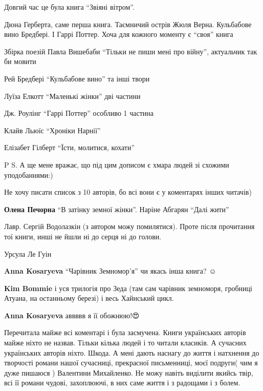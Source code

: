 Довгий час це була книга \enquote{Звіяні вітром}.


Дюна Герберта, саме перша книга. Таємничий острів Жюля Верна. Кульбабове вино
Бредбері. І Гаррі Поттер. Хоча для кожного моменту є \enquote{своя} книга


Збірка поезій Павла Вишебаби \enquote{Тільки не пиши мені про війну}, актуальчик так би мовити


Рей Бредбері \enquote{Кульбабове вино} та інші твори

Луїза Елкотт \enquote{Маленькі жінки} дві частини

Дж. Роулінг \enquote{Гаррі Поттер} особливо 1 частина

Клайв Льюїс \enquote{Хроніки Нарнії}

Елізабет Гілберт \enquote{Їсти, молитися, кохати}

P S. А ще мене вражає, що під цим дописом є хмара людей зі схожими уподобаннями:)

Не хочу писати список з 10 авторів, бо всі вони є у коментарях інших читачів)

\textbf{Олена Печорна} \enquote{В затінку земної жінки}. Наріне Абгарян \enquote{Далі жити}


Лавр. Сергій Водолазкін (з автором можу помилятися). Проте після прочитання тої
книги, инші не йшли ні до серця ні до голови.


Урсула Ле Гуін

\begin{itemize} %
\textbf{Anna Kosaryeva} \enquote{Чарівник Земномор'я} чи якась інша книга? ☺️

\textbf{Kim Bommie} і уся трилогія про Зеда (там сам чарівник земноморя, гробниці Атуана, на останньому березі) і весь Хайнський цикл.

\textbf{Anna Kosaryeva} аввввв я її обожнюю!😍🥰
\end{itemize} %


Перечитала майже всі коментарі і була засмучена. Книги українських авторів
майже ніхто не назвав. Тільки кілька людей і то читали класиків. А сучасних
українських авторів ніхто. Шкода. А мені дають наснагу до життя і натхнення до
творчості романи нашої сучасниці, прекрасної письменниці, моєї подруги( чим я
дуже пишаюся ) Валентини Михайленко. Не можу навіть виділити якийсь твір, всі
її романи чудові, захоплюючі, в них саме життя і з радощами і з болем.

